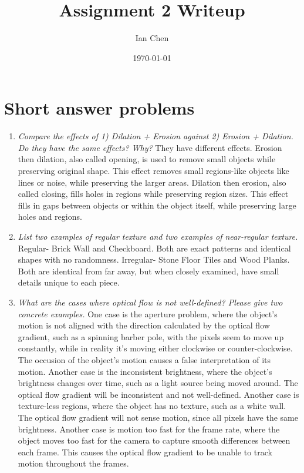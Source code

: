 \documentclass[11pt]{article}
\title{Assignment 2 Writeup}
\author{Ian Chen}
\date{\today}
\begin{document}
    \maketitle

    \section{Short answer problems}
    
    \begin{enumerate}
    \item \textit{Compare the effects of 1) Dilation + Erosion against 2) Erosion + Dilation. Do they have the same
    effects? Why?}\newline
    They have different effects. Erosion then dilation, also called opening, is used to
    remove small objects while preserving original shape. This effect removes small regions-like objects like lines
    or noise, while preserving the larger areas. Dilation then erosion, also called closing, fills holes in regions
    while preserving region sizes. This effect fills in gaps between objects or within the object itself, while
    preserving large holes and regions.\newline

    \item \textit{List two examples of regular texture and two examples of near-regular texture.}\newline
    Regular- Brick Wall and Checkboard. Both are exact patterns and identical shapes with no randomness.\newline
    Irregular- Stone Floor Tiles and Wood Planks. Both are identical from far away, but when closely examined, have
    small details unique to each piece.\newline

    \item \textit{What are the cases where optical flow is not well-defined? Please give two concrete examples.}\newline
    One case is the aperture problem, where the object's motion is not aligned with the direction calculated by the
    optical flow gradient, such as a spinning barber pole, with the pixels seem to move up constantly, while in
    reality it's moving either clockwise or counter-clockwise. The occusion of the object's motion causes a false
    interpretation of its motion.\newline
    Another case is the inconsistent brightness, where the object's brightness changes over time, such as a
    light source being moved around. The optical flow gradient will be inconsistent and not well-defined.\newline
    Another case is texture-less regions, where the object has no texture, such as a white wall. The optical flow
    gradient will not sense motion, since all pixels have the same brightness.\newline
    Another case is motion too fast for the frame rate, where the object moves too fast for the camera to capture
    smooth differences between each frame. This causes the optical flow gradient to be unable to track motion
    throughout the frames.\newline


\end{enumerate}
\end{document}
